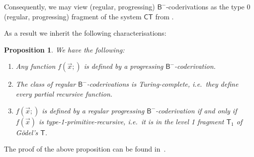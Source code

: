 \documentclass[manuscript,screen]{acmart}
\newtheorem{prop}[thm]{Proposition}
\theoremstyle{definition}
\theoremstyle{remark}
\newcommand{\bc}{\mathsf{B}}
\newcommand{\bcnorec}{\bc^{-}}
\newcommand{\tgodel}{\mathsf{T}}
\newcommand{\ntgodel}[1]{\tgodel_{#1}}
\newcommand{\ct}{\mathsf{CT}}
\begin{document}
Consequently, we may view (regular, progressing) $\bcnorec$-coderivations as the type 0 (regular, progressing) fragment of the system $\ct$ from \cite{Das2021-preprint,Das2021,Kuperberg-Pous21}. 


As a result we inherit the following characterisations:


\begin{prop}
\label{prop:computational-props-coderivations}
We have the following:
\begin{enumerate}
    \item\label{item:type1-complete} Any function $f(\vec x;)$ is defined by a progressing $\bcnorec$-coderivation.
    \item\label{item:turing-complete} The class of regular $\bcnorec$-coderivations is Turing-complete, i.e.\ they define every partial recursive function.
    \item\label{item:type1-prim-rec} $f(\vec x;)$ is defined by a regular progressing $\bcnorec$-coderivation
if and only if 
$f(\vec x)$ is type-1-primitive-recursive, i.e.\ it is in the level 1 fragment $\ntgodel 1$ of G\"odel's $\tgodel$.
\end{enumerate}
\end{prop}

The  proof of the above proposition can be found in~.
\end{document}
